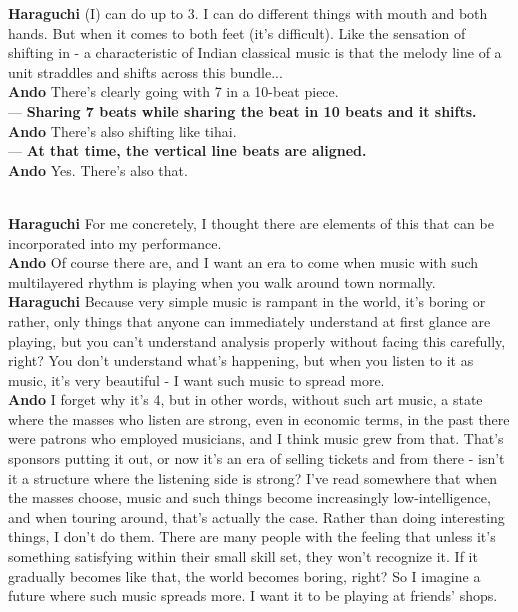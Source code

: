 \begin{description}
{\bf Haraguchi} (I) can do up to 3. I can do different things with mouth and both hands. But when it comes to both feet (it's difficult). Like the sensation of shifting in - a characteristic of Indian classical music is that the melody line of a unit straddles and shifts across this bundle...\\

{\bf Ando} There's clearly going with 7 in a 10-beat piece.\\

--- {\bf Sharing 7 beats while sharing the beat in 10 beats and it shifts.}\\

{\bf Ando} There's also shifting like tihai.\\

--- {\bf At that time, the vertical line beats are aligned.}\\

{\bf Ando} Yes. There's also that.\\

\item [How do you think about the development potential of this work and method?]\mbox{}\\

{\bf Haraguchi} For me concretely, I thought there are elements of this that can be incorporated into my performance.\\

{\bf Ando} Of course there are, and I want an era to come when music with such multilayered rhythm is playing when you walk around town normally.\\

{\bf Haraguchi} Because very simple music is rampant in the world, it's boring or rather, only things that anyone can immediately understand at first glance are playing, but you can't understand analysis properly without facing this carefully, right? You don't understand what's happening, but when you listen to it as music, it's very beautiful - I want such music to spread more.\\

{\bf Ando} I forget why it's 4, but in other words, without such art music, a state where the masses who listen are strong, even in economic terms, in the past there were patrons who employed musicians, and I think music grew from that. That's sponsors putting it out, or now it's an era of selling tickets and from there - isn't it a structure where the listening side is strong? I've read somewhere that when the masses choose, music and such things become increasingly low-intelligence, and when touring around, that's actually the case. Rather than doing interesting things, I don't do them. There are many people with the feeling that unless it's something satisfying within their small skill set, they won't recognize it. If it gradually becomes like that, the world becomes boring, right? So I imagine a future where such music spreads more. I want it to be playing at friends' shops.
\end{description}

